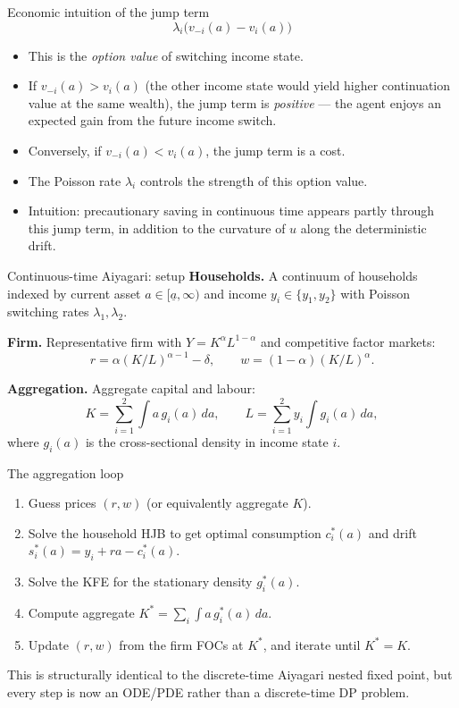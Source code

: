 \documentclass[10pt,english,aspectratio=169]{beamer}
\begin{document}
\begin{frame}{Economic intuition of the jump term}
\[
\lambda_i \big(v_{-i}(a) - v_i(a)\big)
\]
\medskip
\begin{itemize}
\item This is the \emph{option value} of switching income state.
\medskip
\item If $v_{-i}(a) > v_i(a)$ (the other income state would yield higher continuation value at the same wealth), the jump term is \emph{positive} --- the agent enjoys an expected gain from the future income switch.
\medskip
\item Conversely, if $v_{-i}(a) < v_i(a)$, the jump term is a cost.
\medskip
\item The Poisson rate $\lambda_i$ controls the strength of this option value.
\medskip
\item Intuition: precautionary saving in continuous time appears partly through this jump term, in addition to the curvature of $u$ along the deterministic drift.
\end{itemize}
\end{frame}

\begin{frame}{Continuous-time Aiyagari: setup}
\textbf{Households.} A continuum of households indexed by current asset $a \in [\underline a, \infty)$ and income $y_i \in \{y_1, y_2\}$ with Poisson switching rates $\lambda_1, \lambda_2$.
\medskip

\textbf{Firm.} Representative firm with $Y = K^\alpha L^{1-\alpha}$ and competitive factor markets:
\[
r = \alpha (K/L)^{\alpha-1} - \delta, \qquad w = (1-\alpha) (K/L)^\alpha.
\]
\medskip

\textbf{Aggregation.} Aggregate capital and labour:
\[
K = \sum_{i=1}^{2} \int a\, g_i(a)\, da, \qquad
L = \sum_{i=1}^{2} y_i \int g_i(a)\, da,
\]
where $g_i(a)$ is the cross-sectional density in income state $i$.
\end{frame}

\begin{frame}{The aggregation loop}
\begin{enumerate}
\item Guess prices $(r, w)$ (or equivalently aggregate $K$).
\medskip
\item Solve the household HJB to get optimal consumption $c_i^*(a)$ and drift $s_i^*(a) = y_i + r a - c_i^*(a)$.
\medskip
\item Solve the KFE for the stationary density $g_i^*(a)$.
\medskip
\item Compute aggregate $K^* = \sum_i \int a\, g_i^*(a)\, da$.
\medskip
\item Update $(r,w)$ from the firm FOCs at $K^*$, and iterate until $K^* = K$.
\end{enumerate}
\medskip

This is structurally identical to the discrete-time Aiyagari nested fixed point, but every step is now an ODE/PDE rather than a discrete-time DP problem.
\end{frame}
\end{document}
